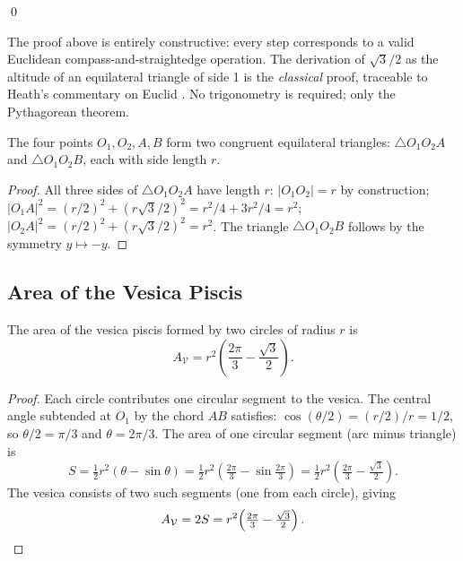 \qed

\begin{remark}
The proof above is entirely constructive: every step corresponds to a
valid Euclidean compass-and-straightedge operation.
The derivation of \(\sqrt{3}/2\) as the altitude of an equilateral
triangle of side 1 is the \emph{classical} proof, traceable to
Heath's commentary on Euclid \cite{euclid_elements}.
No trigonometry is required; only the Pythagorean theorem.
\end{remark}

\begin{corollary}\label{cor:equilateral}
The four points \(O_1, O_2, A, B\) form two congruent equilateral
triangles: \(\triangle O_1 O_2 A\) and \(\triangle O_1 O_2 B\), each
with side length \(r\).
\end{corollary}

\begin{proof}
All three sides of \(\triangle O_1 O_2 A\) have length \(r\):
\(|O_1 O_2| = r\) by construction;
\(|O_1 A|^2 = (r/2)^2 + (r\sqrt{3}/2)^2 = r^2/4 + 3r^2/4 = r^2\);
\(|O_2 A|^2 = (r/2)^2 + (r\sqrt{3}/2)^2 = r^2\).
The triangle \(\triangle O_1 O_2 B\) follows by the symmetry
\(y \mapsto -y\).
\end{proof}

\subsection{Area of the Vesica Piscis}
\label{subsec:ch11-area}

\begin{proposition}\label{prop:area}
The area of the vesica piscis formed by two circles of radius \(r\) is
\[
  A_{\mathcal{V}} = r^2 \!\left(\frac{2\pi}{3} - \frac{\sqrt{3}}{2}\right).
\]
\end{proposition}

\begin{proof}
Each circle contributes one circular segment to the vesica.
The central angle subtended at \(O_1\) by the chord \(AB\) satisfies:
\(\cos(\theta/2) = (r/2)/r = 1/2\), so \(\theta/2 = \pi/3\) and
\(\theta = 2\pi/3\).
The area of one circular segment (arc minus triangle) is
\[
  S = \tfrac{1}{2}r^2(\theta - \sin\theta)
  = \tfrac{1}{2}r^2\!\left(\tfrac{2\pi}{3} - \sin\tfrac{2\pi}{3}\right)
  = \tfrac{1}{2}r^2\!\left(\tfrac{2\pi}{3} - \tfrac{\sqrt{3}}{2}\right).
\]
The vesica consists of two such segments (one from each circle), giving
\[
  A_{\mathcal{V}} = 2S = r^2\!\left(\tfrac{2\pi}{3} - \tfrac{\sqrt{3}}{2}\right).
\qedhere
\]
\end{proof}

